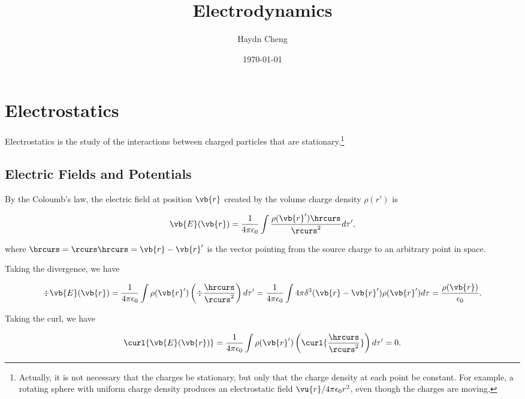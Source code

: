 \documentclass[english,a4paper,12pt]{report}
\title{Electrodynamics}
\author{Haydn Cheng}
\date{\today}
\begin{document}
\maketitle
\tableofcontents
    
\chapter{Electrostatics}

Electrostatics is the study of the interactions between charged particles that are stationary.\footnote{Actually, it is not necessary that the charges be stationary, but only that the charge density at each point be constant. For example, a rotating sphere with uniform charge density produces an electrostatic field \( \vu{r} / 4\pi \epsilon_0 r^2 \), even though the charges are moving.} 

\section{Electric Fields and Potentials}


By the Coloumb's law, the electric field at position \(\vb{r} \) created by the volume charge density \(\rho (r')\) is

\begin{equation}
    \vb{E}(  \vb{r}) = \frac{1}{4\pi \epsilon_0} \int \frac{\rho ( \vb{r}' ) \hrcurs}{\rcurs ^2}   d\tau ', \label{comb} 
\end{equation}

where \(\brcurs = \rcurs \hrcurs = \vb{r} -\vb{r} '\) is the vector pointing from the source charge to an arbitrary point in space.

Taking the divergence, we have 

\begin{equation}\label{gauss} 
    \div{\vb{E}(\vb{r} )} = \frac{1}{4\pi\epsilon_0} \int \rho (\vb{r} ') \left(\div{\frac{\hrcurs }{\rcurs ^2} }\right) d\tau ' = \frac{1}{4\pi \epsilon_0} \int 4\pi \delta ^3 (\vb{r} - \vb{r} ')\rho (\vb{r} ') d\tau = \frac{\rho (\vb{r} )}{\epsilon _0}.  	 
\end{equation}

Taking the curl, we have 

\begin{equation}
    \curl{\vb{E}(\vb{r} ) } = \frac{1}{4\pi \epsilon_0} \int \rho(\vb{r} ') \left( \curl{ \frac{\hrcurs }{\rcurs ^2}  }\right)  d\tau'  = 0.
\end{equation}
\end{document}
